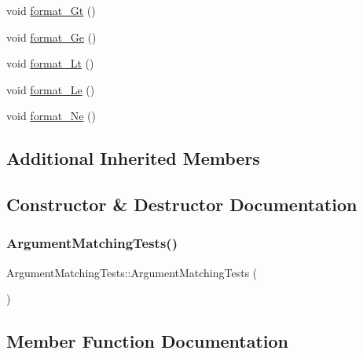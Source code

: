 \begin{DoxyCompactItemize}
void \mbox{\hyperlink{structArgumentMatchingTests_a987755434078c507d49659ccfbbfb71e}{format\+\_\+\+Gt}} ()
\item 
void \mbox{\hyperlink{structArgumentMatchingTests_a49aea0b4ebb8aac730bc9f050b186068}{format\+\_\+\+Ge}} ()
\item 
void \mbox{\hyperlink{structArgumentMatchingTests_a77735b3847a9b7754ee17fb7b7d07eb1}{format\+\_\+\+Lt}} ()
\item 
void \mbox{\hyperlink{structArgumentMatchingTests_a70b2adcf6f366ffb2977e1445765c874}{format\+\_\+\+Le}} ()
\item 
void \mbox{\hyperlink{structArgumentMatchingTests_a231bdd49a450e39f5205e19cf4211ffb}{format\+\_\+\+Ne}} ()
\end{DoxyCompactItemize}
\subsection*{Additional Inherited Members}


\subsection{Constructor \& Destructor Documentation}
\mbox{\label{structArgumentMatchingTests_a605a94720d45e2d2d1fec3cdd674c9f8}} 
\subsubsection{\texorpdfstring{ArgumentMatchingTests()}{ArgumentMatchingTests()}}
{\footnotesize\ttfamily Argument\+Matching\+Tests\+::\+Argument\+Matching\+Tests (\begin{DoxyParamCaption}{ }\end{DoxyParamCaption})\hspace{0.3cm}{\ttfamily [inline]}}



\subsection{Member Function Documentation}
\mbox{\label{structArgumentMatchingTests_aac5007027668bfd2576b7a331c859af0}} 
